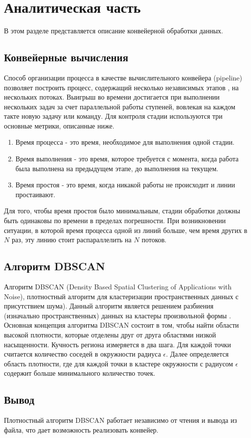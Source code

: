 \chapter{Аналитическая часть}

В этом разделе представляется описание конвейерной обработки данных.


\section{Конвейерные вычисления}

Способ организации процесса в качестве вычислительного конвейера (pipeline) позволяет построить процесс, содержащий несколько независимых этапов \cite{pipeline}, на нескольких потоках. Выигрыш во времени достигается при выполнении нескольких задач за счет параллельной работы ступеней, вовлекая на каждом такте новую задачу или команду. 
Для контроля стадии используются три основные метрики, описанные ниже.
\begin{enumerate}
	\setlength{\itemsep}{1.2pt}
	\item Время процесса - это время, необходимое для выполнения одной стадии.
	\item Время выполнения - это время, которое требуется с момента, когда работа была выполнена на предыдущем этапе, до выполнения на текущем. 
	\item Время простоя - это время, когда никакой работы не происходит и линии простаивают. 
\end{enumerate}
Для того, чтобы время простоя было минимальным, стадии обработки должны быть одинаковы по времени в пределах погрешности. При возникновении ситуации, в которой время процесса одной из линий больше, чем время других в $N$ раз, эту линию стоит распараллелить на $N$ потоков. 



\section{Алгоритм DBSCAN}

Алгоритм DBSCAN \cite{dbscan} (Density Based Spatial Clustering of Applications with Noise),
плотностный алгоритм для кластеризации пространственных данных с присутствием
шума). 
Данный алгоритм является решением разбиения (изначально пространственных) данных на кластеры произвольной формы \cite{cluster}.
Основная концепция алгоритма DBSCAN состоит в том, чтобы найти области высокой плотности, которые отделены друг от друга областями низкой насыщенности.
Кучность региона измеряется в два шага. 
Для каждой точки считается количество соседей в окружности радиуса $\epsilon$.
Далее определяется область плотности, где для каждой точки в кластере окружности с радиусом $\epsilon$ содержит больше минимального количество точек.

\section*{Вывод}

Плотностный алгоритм DBSCAN работает независимо от чтения и вывода из файла, что дает возможность реализовать конвейер.